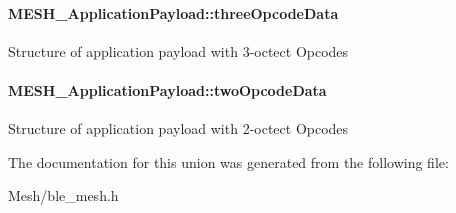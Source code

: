 \paragraph[{\texorpdfstring{three\+Opcode\+Data}{threeOpcodeData}}]{ M\+E\+S\+H\+\_\+\+Application\+Payload\+::three\+Opcode\+Data}\hypertarget{union_m_e_s_h___application_payload_a5e3e1054179df6b737f60086c4b30503}{}\label{union_m_e_s_h___application_payload_a5e3e1054179df6b737f60086c4b30503}
Structure of application payload with 3-\/octect Opcodes 
\paragraph[{\texorpdfstring{two\+Opcode\+Data}{twoOpcodeData}}]{ M\+E\+S\+H\+\_\+\+Application\+Payload\+::two\+Opcode\+Data}\hypertarget{union_m_e_s_h___application_payload_a5f06db46b03f97799a775325c9f9246f}{}\label{union_m_e_s_h___application_payload_a5f06db46b03f97799a775325c9f9246f}
Structure of application payload with 2-\/octect Opcodes 

The documentation for this union was generated from the following file\+:\begin{DoxyCompactItemize}
\item 
Mesh/ble\+\_\+mesh.\+h\end{DoxyCompactItemize}
